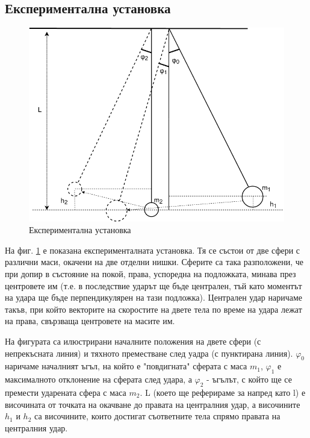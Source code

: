 \documentclass[12pt]{article}
\begin{document}
\subsection{Експериментална установка}\label{sec:experimental-setup}
\begin{figure}
    \centering
    \includegraphics[width=\textwidth]{images/spehres-momentum-conservation-law.drawio.png}
    \caption{Експериментална установка}
    \label{fig:setup}
\end{figure}

На фиг. \ref{fig:setup} е показана експерименталната установка. Тя се състои от две сфери с различни маси, окачени на две отделни нишки. Сферите са така разположени, че при допир в състояние на покой, права, успоредна на подложката, минава през центровете им (т.е. в последствие ударът ще бъде централен, тъй като моментът на удара ще бъде перпендикулярен на тази подложка). Централен удар наричаме такъв, при който векторите на скоростите на двете тела по време на удара лежат на права, свързваща центровете на масите им.

На фигурата са илюстрирани началните положения на двете сфери (с непрекъсната линия) и тяхното преместване след уадра (с пунктирана линия). \(\varphi_0\) наричаме началният ъгъл, на който е "повдигната" сферата с маса \(m_1\), \(\varphi_1\) е максималното отклонение на сферата след удара, а \(\varphi_2\) - ъгълът, с който ще се премести ударената сфера с маса \(m_2\). L (което ще реферираме за напред като l) е височината от точката на окачване до правата на централния удар, а височините \(h_1\) и \(h_2\) са височините, които достигат съответните тела спрямо правата на централния удар.
\end{document}
